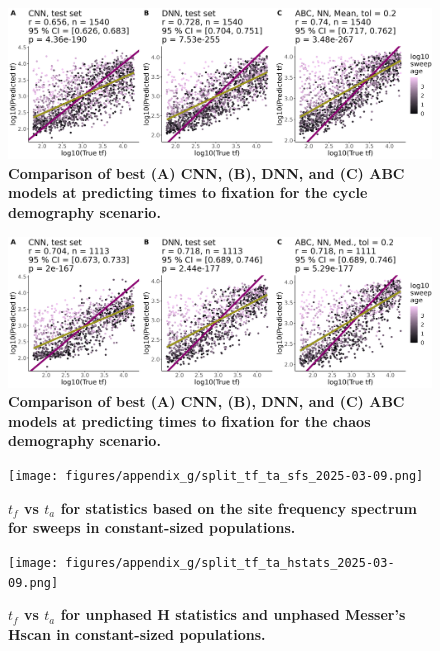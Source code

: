 \documentclass[12pt]{article}
\begin{document}
\begin{figure}[H]
\centering
  \includegraphics[width=\textwidth]{figures/appendix_g/best_models_cycle_2025-03-07.png}
  \caption{\textbf{Comparison of best (A) CNN, (B), DNN, and (C) ABC models at predicting times to fixation for the cycle demography scenario.}}
  \label{fig:cycle_comparison}
\end{figure}

\begin{figure}[H]
\centering
  \includegraphics[width=\textwidth]{figures/appendix_g/best_models_chaos_2025-03-08.png}
  \caption{\textbf{Comparison of best (A) CNN, (B), DNN, and (C) ABC models at predicting times to fixation for the chaos demography scenario.}}
  \label{fig:chaos_comparison}
\end{figure}

\begin{figure}[H]
\centering
  \texttt{[image: figures/appendix\_g/split\_tf\_ta\_sfs\_2025-03-09.png]}
  \caption{\textbf{$t_f$ vs $t_a$ for statistics based on the site frequency spectrum for sweeps in constant-sized populations.}}
  \label{fig:ident_sfs}
\end{figure}

\begin{figure}[H]
\centering
  \texttt{[image: figures/appendix\_g/split\_tf\_ta\_hstats\_2025-03-09.png]}
  \caption{\textbf{$t_f$ vs $t_a$ for unphased H statistics and unphased Messer's Hscan in constant-sized populations.}}
  \label{fig:ident_hstats}
\end{figure}
\end{document}
